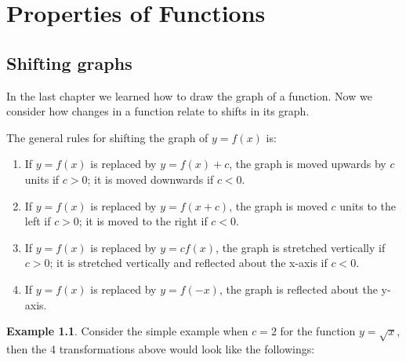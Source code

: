 \documentclass[10pt,a4paper]{book}
\theoremstyle{definition}\newtheorem{definition}{Definition}
\theoremstyle{definition}\newtheorem{fact}{Fact}
\theoremstyle{definition}\newtheorem{ex}{Ex.}
\theoremstyle{definition}\newtheorem{project}{Project}
\theoremstyle{definition}\newtheorem{problem}{Problem}
\theoremstyle{definition}\newtheorem{example}{Example}
\numberwithin{theorem}{chapter}
\numberwithin{corollary}{chapter}
\numberwithin{assumption}{chapter}
\numberwithin{definition}{chapter}
\numberwithin{prop}{chapter}
\numberwithin{notation}{chapter}
\numberwithin{problem}{chapter}
\numberwithin{example}{chapter}
\numberwithin{fact}{chapter}
\numberwithin{ex}{chapter}
\begin{document}
	\chapter{Properties of Functions}
	
	\section{Shifting graphs}
	
	In the last chapter we learned how to draw the graph of a function. Now we consider how changes in a function relate to shifts in its graph.
	
	The general rules for shifting the graph of $y = f(x)$ is:
	\begin{enumerate}[label=(\roman*)]
		\item If $y = f(x)$ is replaced by $y = f(x) + c$, the graph is moved upwards by $c$ units if $c > 0$; it is moved downwards if $c < 0$.
		\item If $y = f(x)$ is replaced by $y = f(x + c)$, the graph is moved $c$ units to the left if $c > 0$; it is moved to the right if $c < 0$.
		\item If $y = f(x)$ is replaced by $y = c f(x)$, the graph is stretched vertically if $c > 0$; it is stretched vertically and reflected about the x-axis if $c < 0$.
		\item If $y = f(x)$ is replaced by $y = f(-x)$, the graph is reflected about the y-axis.
	\end{enumerate}
	
	\begin{example}
		Consider the simple example when $c = 2$ for the function $y = \sqrt{x}$, then the 4 transformations above would look like the followings:
	\end{example}
	
	
\end{document}
